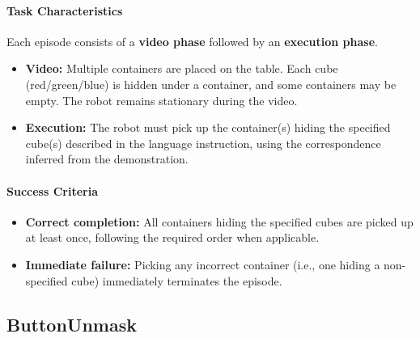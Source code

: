 \paragraph{Task Characteristics}
Each episode consists of a \textbf{video phase} followed by an \textbf{execution phase}.
\begin{itemize}[itemsep=1pt, topsep=0pt, leftmargin=*]
    \item \textbf{Video:} Multiple containers are placed on the table. Each cube (red/green/blue) is hidden under a container, and some containers may be empty. The robot remains stationary during the video.
    
    \item \textbf{Execution:} The robot must pick up the container(s) hiding the specified cube(s) described in the language instruction, using the correspondence inferred from the demonstration.
\end{itemize}

\paragraph{Success Criteria}
\begin{itemize}[itemsep=1pt, topsep=0pt, leftmargin=*]
    \item \textbf{Correct completion:} All containers hiding the specified cubes are picked up at least once, following the required order when applicable.
    
    \item \textbf{Immediate failure:} Picking any incorrect container (i.e., one hiding a non-specified cube) immediately terminates the episode.
\end{itemize}



\clearpage





\subsection{ButtonUnmask}
\label{sec:task_buttonunmask}

